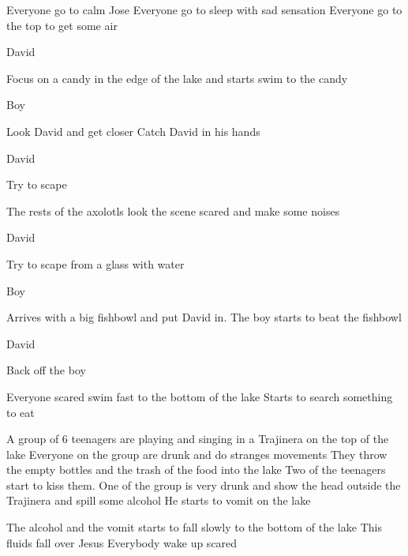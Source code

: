 \documentclass{screenplay}[2012/06/30]
\begin{document}
Everyone go to calm Jose
Everyone go to sleep with sad sensation
Everyone go to the top to get some air

\begin{dialogue}[interested]{David}
\end{dialogue}

Focus on a candy in the edge of the lake and starts swim to the candy

\begin{dialogue}[amazed]{Boy}
\end{dialogue}

Look David and get closer
Catch David in his hands

\begin{dialogue}[scared]{David}
\end{dialogue}

Try to scape

The rests of the axolotls look the scene scared and make some noises
\fadeout
\fadein


\begin{dialogue}[scared]{David}
\end{dialogue}

Try to scape from a glass with water

\begin{dialogue}[excited]{Boy}
\end{dialogue}

Arrives with a big fishbowl and put David in.
The boy starts to beat the fishbowl

\begin{dialogue}{David}
\end{dialogue}

Back off the boy
\fadeout
\fadein


Everyone scared swim fast to the bottom of the lake
Starts to search something to eat
\fadeout
\fadein

A group of 6 teenagers are playing and singing in a Trajinera on the top of the lake
Everyone on the group are drunk and do stranges movements
They throw the empty bottles and the trash of the food into the lake
Two of the teenagers start to kiss them.
One of the group is very drunk and show the head outside the Trajinera and spill some alcohol
He starts to vomit on the lake

The alcohol and the vomit starts to fall slowly to the bottom of the lake
This fluids fall over Jesus 
Everybody wake up scared
\end{document}
